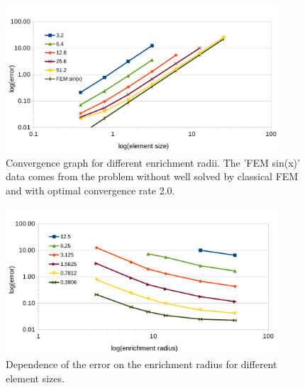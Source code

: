\documentclass[preprint,12pt]{elsarticle}
\newcommand{\figpath}{../graphics/}
\begin{document}
\begin{figure}[!htb]
  \centering    
  \includegraphics[width=0.9\textwidth]{results/radius_conv_1.pdf}
  \caption[Enrichment radius choice.]{Convergence graph for different enrichment radii. The 'FEM sin(x)'
  data comes from the problem without well solved by classical FEM and with optimal convergence rate 2.0.}
  \label{fig:radius_conv_1}
\end{figure}
\begin{figure}[!htb]
  \centering    
  \includegraphics[width=0.9\textwidth]{results/radius_conv_2.pdf}
  \caption[Enrichment radius choice.]{Dependence of the error on the enrichment radius for different
  element sizes.}
  \label{fig:radius_conv_2}
\end{figure}
\end{document}
